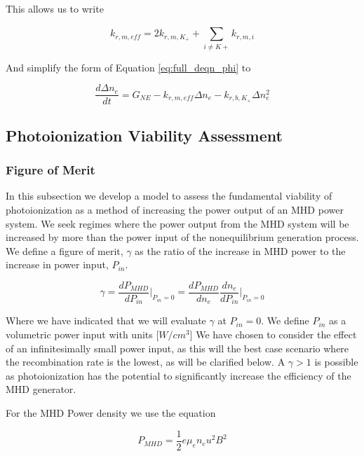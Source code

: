 This allows us to write

\begin{equation}
  \label{eq:krm_eff_final}
  k_{r, m, eff} = 2k_{r, m, K_{+}} + \sum_{i \neq K+}^{}k_{r, m, i}
\end{equation}

And simplify the form of Equation \ref{eq:full_deqn_phi} to

\begin{equation}
  \label{eq:final_deqn_Kp}
\frac{d\Delta n_{e}}{dt} = G_{NE}   -   k_{r, m, eff}\Delta n_{e} - k_{r, b, K_{+}}\Delta n_{e}^2
\end{equation}




\subsection{Photoionization Viability Assessment}

\subsubsection{Figure of Merit}

In this subsection we develop a model to assess the fundamental viability of photoionization as a method of increasing the power output of an MHD power system. We seek regimes where the power output from the MHD system will be increased by more than the power input of the nonequilibrium generation process. We define a figure of merit, $\gamma$ as the ratio of the increase in MHD power to the increase in power input, $P_{in}$.


\begin{equation}
  \label{eq:beta_def}
\gamma = \frac{dP_{MHD}}{dP_{in}} \Big|_{P_{in}=0} = \frac{dP_{MHD}}{dn_{e}}\frac{dn_{e}}{dP_{in}}\Big|_{P_{in}=0}
\end{equation}

Where we have indicated that we will evaluate $\gamma$ at $P_{in} = 0$. We define $P_{in}$ as a volumetric power input with units [$W/cm^3$] We have chosen to consider the effect of an infinitesimally small power input, as this will the best case scenario where the recombination rate is the lowest, as will be clarified below. A $\gamma > 1$ is possible as photoionization has the potential to significantly increase the efficiency of the MHD generator. 

For the MHD Power density we use the equation

\begin{equation}
  \label{eq:mhd_power}
P_{MHD} = \frac{1}{2} e \mu_e n_e u^2 B^2
\end{equation}

